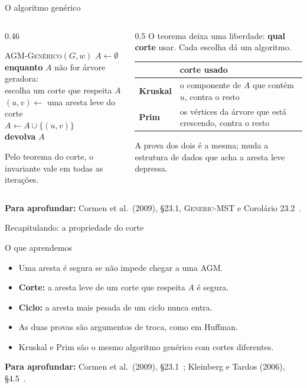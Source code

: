 \documentclass[aspectratio=169,xcolor=table]{beamer}
\newcommand{\fonte}[1]{%
  \vfill
  {\tiny\color{gray!55!black}\textbf{Para aprofundar:} #1\par}%
}
\begin{document}
\begin{frame}{O algoritmo genérico}
  \begin{columns}[c]
    \begin{column}{0.46\textwidth}
      \begin{block}{\textsc{AGM-Genérico}$(G, w)$}
        \small
        $A \gets \emptyset$\\
        \textbf{enquanto} $A$ não for árvore geradora:\\
        \quad escolha um corte que respeita $A$\\
        \quad $(u,v) \gets$ uma aresta leve do corte\\
        \quad $A \gets A \cup \{(u,v)\}$\\
        \textbf{devolva} $A$
      \end{block}
      \scriptsize Pelo teorema do corte, o invariante vale em todas as iterações.
    \end{column}
    \begin{column}{0.5\textwidth}
      \scriptsize
      O teorema deixa uma liberdade: \textbf{qual corte} usar. Cada escolha dá um algoritmo.
      \medskip

      \begin{tabular}{p{1.2cm}p{4.2cm}}
        \toprule
        & corte usado \\
        \midrule
        \textbf{Kruskal} & o componente de $A$ que contém $u$, contra o resto \\
        \addlinespace
        \textbf{Prim} & os vértices da árvore que está crescendo, contra o resto \\
        \bottomrule
      \end{tabular}
      \medskip

      A prova dos dois é a mesma; muda a estrutura de dados que acha a aresta leve depressa.
    \end{column}
  \end{columns}
  \fonte{Cormen et al.\ (2009), \S 23.1, \textsc{Generic-MST} e Corolário
    23.2~\cite{cormen2009introduction}.}
\end{frame}

\begin{frame}{Recapitulando: a propriedade do corte}
  \begin{block}{O que aprendemos}
    \begin{itemize}
      \item Uma aresta é segura se não impede chegar a uma AGM.
      \item \textbf{Corte:} a aresta leve de um corte que respeita $A$ é segura.
      \item \textbf{Ciclo:} a aresta mais pesada de um ciclo nunca entra.
      \item As duas provas são argumentos de troca, como em Huffman.
      \item Kruskal e Prim são o mesmo algoritmo genérico com cortes diferentes.
    \end{itemize}
  \end{block}
  \fonte{Cormen et al.\ (2009), \S 23.1~\cite{cormen2009introduction};
    Kleinberg e Tardos (2006), \S 4.5~\cite{kleinberg2006algorithm}.}
\end{frame}
\end{document}
